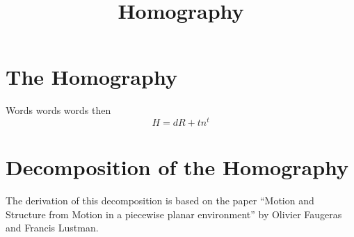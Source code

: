 \documentclass{article}
\begin{document}
%
\title {Homography}
%
\maketitle
%
\section {The Homography}
%
Words words words then
%
\begin {equation} \label {eq:homography}
H = d R + t n^t
\end {equation}
%
\section {Decomposition of the Homography}
%
The derivation of this decomposition is based on the paper ``Motion and Structure from Motion in a piecewise planar environment'' by Olivier Faugeras and Francis Lustman.
\end{document}
